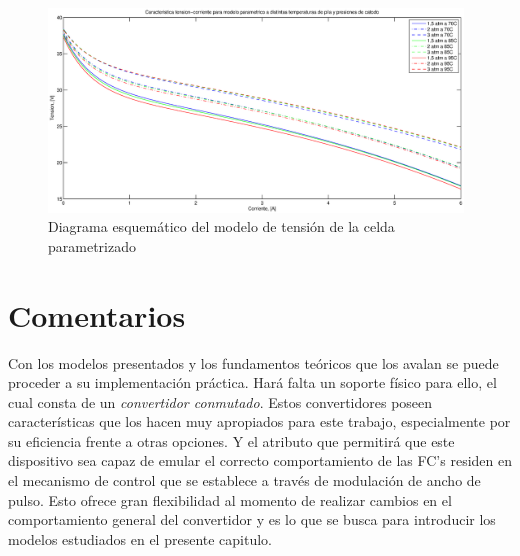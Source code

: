 \begin{figure}
 \centering
 \includegraphics[width=11cm]{gfx/I-V.eps}
 \caption{Diagrama esquemático del modelo de tensión de la celda parametrizado}
 \label{fig:curvas_modelo_2}
\end{figure}

\section{Comentarios}
Con los modelos presentados y los fundamentos teóricos que los avalan se puede proceder a su implementación práctica.
Hará falta un soporte físico para ello, el cual consta de un \emph{convertidor conmutado}. Estos convertidores poseen características
que los hacen muy apropiados para este trabajo, especialmente por su eficiencia frente a otras opciones. Y el atributo que permitirá que este
dispositivo sea capaz de emular el correcto comportamiento de las FC's residen en el mecanismo de control que se establece a través de modulación
de ancho de pulso. Esto ofrece gran flexibilidad al momento de realizar cambios en el comportamiento general del convertidor y es lo que se busca
para introducir los modelos estudiados en el presente capitulo.